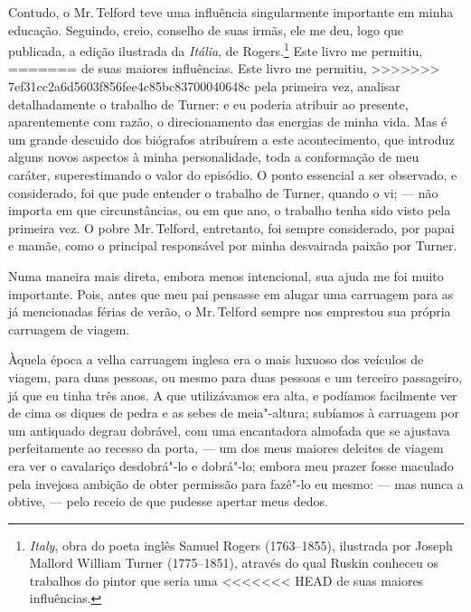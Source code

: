 {{{{{{{{{{{{Contudo, o Mr.\,Telford teve uma influência singularmente importante em
minha educação. Seguindo, creio, conselho de suas irmãs, ele me deu,
logo que publicada, a edição ilustrada da \textit{Itália}, de
Rogers.\footnote{\textit{Italy}, obra do poeta inglês Samuel Rogers
  (1763--1855), ilustrada por Joseph Mallord William Turner (1775--1851),
  através do qual Ruskin conheceu os trabalhos do pintor que seria uma
<<<<<<< HEAD
  de suas maiores influências.} Este livro me permitiu,
=======
  de suas maiores influências.  Este livro me permitiu,
>>>>>>> 7ef31cc2a6d5603f856fee4c85bc83700040648c
pela primeira vez, analisar detalhadamente o trabalho de Turner: e eu
poderia atribuir ao presente, aparentemente com razão, o direcionamento
das energias de minha vida. Mas é um grande descuido dos biógrafos
atribuírem a este acontecimento, que introduz alguns novos aspectos à
minha personalidade, toda a conformação de meu caráter, superestimando o
valor do episódio. O ponto essencial a ser observado, e considerado, foi
que pude entender o trabalho de Turner, quando o vi; --- não importa em
que circunstâncias, ou em que ano, o trabalho tenha sido visto pela
primeira vez. O pobre Mr.\,Telford, entretanto, foi sempre considerado,
por papai e mamãe, como o principal responsável por minha desvairada
paixão por Turner.

Numa maneira mais direta, embora menos intencional, sua ajuda me foi
muito importante. Pois, antes que meu pai pensasse em alugar uma
carruagem para as já mencionadas férias de verão, o Mr.\,Telford sempre
nos emprestou sua própria carruagem de viagem.

Àquela época a velha carruagem inglesa era o mais luxuoso dos veículos
de viagem, para duas pessoas, ou mesmo para duas pessoas e um terceiro
passageiro, já que eu tinha três anos. A que utilizávamos era alta, e
podíamos facilmente ver de cima os diques de pedra e as sebes de
meia"-altura; subíamos à carruagem por um antiquado degrau dobrável, com
uma encantadora almofada que se ajustava perfeitamente ao recesso da
porta, --- um dos meus maiores deleites de viagem era ver o cavalariço
desdobrá"-lo e dobrá"-lo; embora meu prazer fosse maculado pela invejosa
ambição de obter permissão para fazê"-lo eu mesmo: --- mas nunca a obtive,
--- pelo receio de que pudesse apertar meus dedos.

}}}}}}}}}}}}
